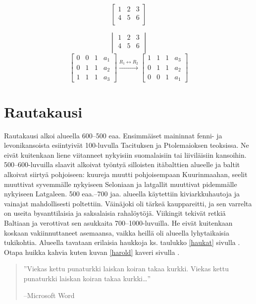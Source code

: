 \documentclass[a4paper]{article}
\theoremstyle{definition}
\theoremstyle{remark}
\begin{document}
\[
\begin{bmatrix}
1 & 2 & 3 \\
4 & 5 & 6 \\
\end{bmatrix}
\]

\[
\begin{vmatrix}
1 & 2 & 3 \\
4 & 5 & 6 \\
\end{vmatrix}
\]
\[
\begin{bmatrix}
0 & 0 & 1 & a_1 \\
0 & 1 & 1 & a_2 \\
1 & 1 & 1 & a_3
\end{bmatrix}
\xrightarrow{R_1 \leftrightarrow R_2} 
\begin{bmatrix}
1 & 1 & 1 & a_3 \\
0 & 1 & 1 & a_2 \\
0 & 0 & 1 & a_1
\end{bmatrix}
\]


\section{Rautakausi}

Rautakausi alkoi alueella 600–500 eaa. Ensimmäiset maininnat fenni- ja levonikansoista esiintyivät 100-luvulla Tacituksen ja Ptolemaioksen teoksissa. Ne eivät kuitenkaan liene viitanneet nykyisiin suomalaisiin tai liiviläisiin kansoihin. 500–600-luvuilla slaavit alkoivat työntyä silloisten itäbalttien alueelle ja baltit alkoivat siirtyä pohjoiseen: kuureja muutti pohjoisempaan Kuurinmaahan, seelit muuttivat syvemmälle nykyiseen Seloniaan ja latgallit muuttivat pidemmälle nykyiseen Latgaleen. 500 eaa.–700 jaa. alueella käytettiin kiviarkkuhautoja ja vainajat mahdollisesti poltettiin. Väinäjoki oli tärkeä kauppareitti, ja sen varrelta on useita bysanttilaisia ja saksalaisia rahalöytöjä. Viikingit tekivät retkiä Baltiaan ja verottivat sen asukkaita 700–1000-luvuilla. He eivät kuitenkaan koskaan vakiinnuttaneet asemaansa, vaikka heillä oli alueella lyhytaikaisia tukikohtia.
Alueella tavataan erilaisia haukkoja ks. taulukko \ref{haukat} sivulla \pageref{haukat}. Otapa huikka kahvia kuten kuvan \ref{harold} kaveri sivulla \pageref{harold}.
\begin{quote}
''Viekas kettu punaturkki laiskan koiran takaa kurkki. Viekas kettu punaturkki laiskan koiran takaa kurkki\dots ''
\begin{flushright}
--Microsoft Word
\end{flushright}
\end{quote}
\end{document}
